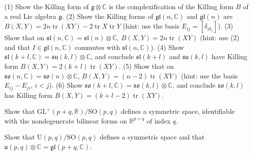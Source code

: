\begin{remark}
  \label{rem:pet-ch10-exercise-killing-form-classical}

  (1) Show the Killing form of $\mathfrak g\otimes\mathbb C$ is the
  complexification of the Killing form $B$ of a real Lie algebra $\mathfrak g$.
  (2) Show the Killing forms of $\mathfrak{gl}(n,\mathbb C)$ and $\mathfrak{gl}(n)$
  are $B(X,Y)=2n\operatorname{tr}(XY)-2\operatorname{tr}X\operatorname{tr}Y$ (hint: use the basis
  $E_{ij}=[\delta_{i\delta_j}]$). (3) Show that on
  $\mathfrak{sl}(n,\mathbb C)=\mathfrak{sl}(n)\otimes\mathbb C$, $B(X,Y)=2n\operatorname{tr}(XY)$
  (hint: use (2) and that $I\in\mathfrak{gl}(n,\mathbb C)$ commutes with
  $\mathfrak{sl}(n,\mathbb C)$). (4) Show $\mathfrak{sl}(k+l,\mathbb C)=\mathfrak{su}(k,l)\otimes\mathbb C$,
  and conclude $\mathfrak{sl}(k+l)$ and $\mathfrak{su}(k,l)$ have Killing form
  $B(X,Y)=2(k+l)\operatorname{tr}(XY)$. (5) Show that on
  $\mathfrak{so}(n,\mathbb C)=\mathfrak{so}(n)\otimes\mathbb C$, $B(X,Y)=(n-2)\operatorname{tr}(XY)$
  (hint: use the basis $E_{ij}-E_{ji}$, $i<j$). (6) Show
  $\mathfrak{so}(k+l,\mathbb C)=\mathfrak{so}(k,l)\otimes\mathbb C$, and conclude
  $\mathfrak{so}(k,l)$ has Killing form $B(X,Y)=(k+l-2)\operatorname{tr}(XY)$.
\end{remark}

\begin{remark}
  \label{rem:pet-ch10-exercise-gl-so-symmetric}

  Show that $\mathrm{GL}^+(p+q,\mathbb R)/\mathrm{SO}(p,q)$ defines a symmetric space,
  identifiable with the nondegenerate bilinear forms on $\mathbb R^{p+q}$ of index
  $q$.
\end{remark}

\begin{remark}
  \label{rem:pet-ch10-exercise-u-pq-so-pq-symmetric}

  Show that $\mathrm U(p,q)/\mathrm{SO}(p,q)$ defines a symmetric space and that
  $\mathfrak u(p,q)\otimes\mathbb C=\mathfrak{gl}(p+q,\mathbb C)$.
\end{remark}


